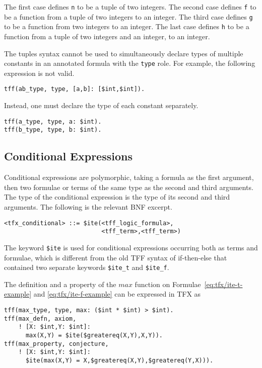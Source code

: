 The first case defines \lstinline|n| to be a tuple of two integers.
The second case defines \lstinline|f| to be a function from a tuple of two integers
to an integer.
The third case defines \lstinline|g| to be a function from two integers to an integer.
The last case defines \lstinline|h| to be a function from a tuple of two integers and
an integer, to an integer.

The tuples syntax cannot be used to simultaneously declare types of multiple constants in an annotated formula with the \lstinline'type' role. For example, the following expression is not valid.
\begin{lstlisting}[language=tptp]
tff(ab_type, type, [a,b]: [$int,$int]).
\end{lstlisting}
Instead, one must declare the type of each constant separately.
\begin{lstlisting}[language=tptp]
tff(a_type, type, a: $int).
tff(b_type, type, b: $int).
\end{lstlisting}

\subsection{Conditional Expressions}

Conditional expressions are polymorphic, taking a formula as the first 
argument, then two formulae or terms of the same type as the second and 
third arguments. 
The type of the conditional expression is the type of its second and third 
arguments. 
The following is the relevant BNF excerpt.
\begin{lstlisting}[language=bnf]
<tfx_conditional> ::= $ite(<tff_logic_formula>,
                           <tff_term>,<tff_term>)
\end{lstlisting}

The keyword \lstinline'$ite' is used for conditional expressions occurring both as
terms and formulae, which is different from the old TFF syntax of if-then-else
that contained two separate keywords \lstinline'$ite_t' and \lstinline'$ite_f'.

The definition and a property of the $\mathit{max}$ function on Formulae~\ref{eq:tfx/ite-t-example} and \ref{eq:tfx/ite-f-example} can be expressed in
TFX as
\begin{lstlisting}[language=tptp]
tff(max_type, type, max: ($int * $int) > $int).
tff(max_defn, axiom,
    ! [X: $int,Y: $int]:
      max(X,Y) = $ite($greatereq(X,Y),X,Y)).
tff(max_property, conjecture,
    ! [X: $int,Y: $int]: 
      $ite(max(X,Y) = X,$greatereq(X,Y),$greatereq(Y,X))).
\end{lstlisting}

